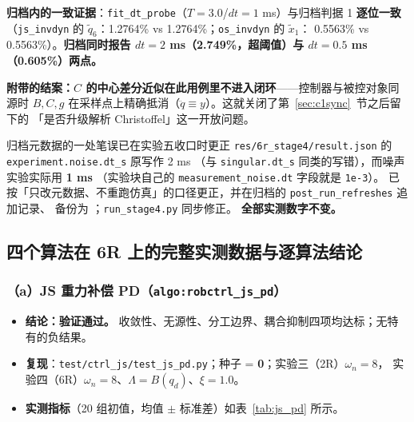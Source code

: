\documentclass[11pt,a4paper]{ctexart}
\begin{document}
\textbf{归档内的一致证据}：\texttt{fit\_dt\_probe}（$T=3.0$/$dt=1$ ms）与归档判据 1 \textbf{逐位一致}
（\texttt{js\_invdyn} 的 $\tilde q_6$：1.2764\% vs 1.2764\%；\texttt{os\_invdyn} 的 $\tilde x_1$：
0.5563\% vs 0.5563\%）。\textbf{归档同时报告 $dt=2$ ms（2.749\%，超阈值）与
$dt=0.5$ ms（0.605\%）两点。}

\textbf{附带的结案：$C$ 的中心差分近似在此用例里不进入闭环}——控制器与被控对象同源时
$B,C,g$ 在采样点上精确抵消（$\ddot q\equiv y$）。这就关闭了第~\ref{sec:c1sync}~节之后留下的
「是否升级解析 Christoffel」这一开放问题。

\begin{warnbox}{归档元数据的一处笔误已在实验五收口时更正}
\texttt{res/6r\_stage4/result.json} 的 \texttt{experiment.noise.dt\_s} 原写作 2 ms
（与 \texttt{singular.dt\_s} 同类的写错），而噪声实验实际用 \textbf{1 ms}
（实验块自己的 \texttt{measurement\_noise.dt} 字段就是 \texttt{1e-3}）。
已按「只改元数据、不重跑仿真」的口径更正，并在归档的 \texttt{post\_run\_refreshes} 追加记录、
备份为 ；\texttt{run\_stage4.py} 同步修正。
\textbf{全部实测数字不变。}
\end{warnbox}

\subsection{四个算法在 6R 上的完整实测数据与逐算法结论}\label{sec:peralgo}

\subsubsection{（a）JS 重力补偿 PD（\texttt{algo:robctrl\_js\_pd}）}

\begin{itemize}[leftmargin=1.6em,itemsep=3pt]
\item \textbf{结论：验证通过。} 收敛性、无源性、分工边界、耦合抑制四项均达标；无特有的负结果。
\item \textbf{复现}：\texttt{test/ctrl\_js/test\_js\_pd.py}；种子 = \textbf{0}；实验三（2R）$\omega_n=8$，
  实验四（6R）$\omega_n=8$、$\Lambda=B(q_d)$、$\xi=1.0$。
\item \textbf{实测指标}（20 组初值，均值 $\pm$ 标准差）如表~\ref{tab:js_pd} 所示。
\end{itemize}
\end{document}
